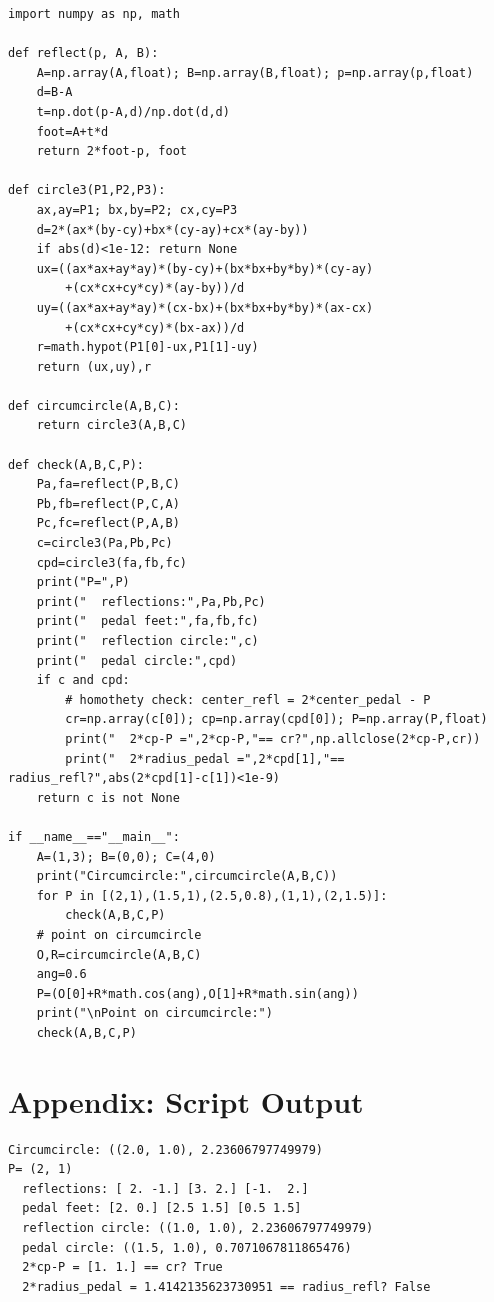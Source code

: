 \documentclass[11pt,a4paper]{article}
\theoremstyle{definition}
\begin{document}
\begin{verbatim}
import numpy as np, math

def reflect(p, A, B):
    A=np.array(A,float); B=np.array(B,float); p=np.array(p,float)
    d=B-A
    t=np.dot(p-A,d)/np.dot(d,d)
    foot=A+t*d
    return 2*foot-p, foot

def circle3(P1,P2,P3):
    ax,ay=P1; bx,by=P2; cx,cy=P3
    d=2*(ax*(by-cy)+bx*(cy-ay)+cx*(ay-by))
    if abs(d)<1e-12: return None
    ux=((ax*ax+ay*ay)*(by-cy)+(bx*bx+by*by)*(cy-ay)
        +(cx*cx+cy*cy)*(ay-by))/d
    uy=((ax*ax+ay*ay)*(cx-bx)+(bx*bx+by*by)*(ax-cx)
        +(cx*cx+cy*cy)*(bx-ax))/d
    r=math.hypot(P1[0]-ux,P1[1]-uy)
    return (ux,uy),r

def circumcircle(A,B,C):
    return circle3(A,B,C)

def check(A,B,C,P):
    Pa,fa=reflect(P,B,C)
    Pb,fb=reflect(P,C,A)
    Pc,fc=reflect(P,A,B)
    c=circle3(Pa,Pb,Pc)
    cpd=circle3(fa,fb,fc)
    print("P=",P)
    print("  reflections:",Pa,Pb,Pc)
    print("  pedal feet:",fa,fb,fc)
    print("  reflection circle:",c)
    print("  pedal circle:",cpd)
    if c and cpd:
        # homothety check: center_refl = 2*center_pedal - P
        cr=np.array(c[0]); cp=np.array(cpd[0]); P=np.array(P,float)
        print("  2*cp-P =",2*cp-P,"== cr?",np.allclose(2*cp-P,cr))
        print("  2*radius_pedal =",2*cpd[1],"== radius_refl?",abs(2*cpd[1]-c[1])<1e-9)
    return c is not None

if __name__=="__main__":
    A=(1,3); B=(0,0); C=(4,0)
    print("Circumcircle:",circumcircle(A,B,C))
    for P in [(2,1),(1.5,1),(2.5,0.8),(1,1),(2,1.5)]:
        check(A,B,C,P)
    # point on circumcircle
    O,R=circumcircle(A,B,C)
    ang=0.6
    P=(O[0]+R*math.cos(ang),O[1]+R*math.sin(ang))
    print("\nPoint on circumcircle:")
    check(A,B,C,P)
\end{verbatim}

\section{Appendix: Script Output}\label{app:script-output}

\begin{verbatim}
Circumcircle: ((2.0, 1.0), 2.23606797749979)
P= (2, 1)
  reflections: [ 2. -1.] [3. 2.] [-1.  2.]
  pedal feet: [2. 0.] [2.5 1.5] [0.5 1.5]
  reflection circle: ((1.0, 1.0), 2.23606797749979)
  pedal circle: ((1.5, 1.0), 0.7071067811865476)
  2*cp-P = [1. 1.] == cr? True
  2*radius_pedal = 1.4142135623730951 == radius_refl? False
\end{verbatim}
\end{document}
